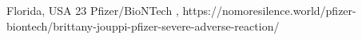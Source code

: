           {Florida, USA}
          {23}
          {Pfizer/BioNTech}
          {}
          {
            ,
          }
          {https://nomoresilence.world/pfizer-biontech/brittany-jouppi-pfizer-severe-adverse-reaction/}

